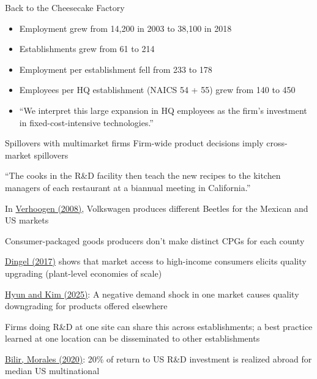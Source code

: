 \documentclass[11pt,notes=hide,aspectratio=169]{beamer}
\begin{document}
\begin{frame}{Back to the Cheesecake Factory}
\begin{itemize}
\item Employment grew from 14,200 in 2003 to 38,100 in 2018
\item Establishments grew from 61 to 214 
\item Employment per establishment fell from 233 to 178
\item Employees per HQ establishment (NAICS 54 + 55) grew from 140 to 450
\item ``We interpret this large expansion in HQ employees as the firm's investment in fixed-cost-intensive technologies.''
\end{itemize}
\end{frame}
\begin{frame}{Spillovers with multimarket firms}
Firm-wide product decisions imply cross-market spillovers
\begin{itemize}{\small
\item ``The cooks in the R\&D facility then teach the new recipes to the kitchen managers of each restaurant at a biannual meeting in California.''
\item In \href{https://doi.org/10.1162/qjec.2008.123.2.489}{Verhoogen (2008)}, Volkswagen produces different Beetles for the Mexican and US markets
\item Consumer-packaged goods producers don't make distinct CPGs for each county
\item \href{https://doi.org/10.1093/restud/rdw054}{Dingel (2017)} shows that market access to high-income consumers elicits quality upgrading (plant-level economies of scale) 
\item \href{https://sites.google.com/site/jungsikhyunecon/research}{Hyun and Kim (2025)}: A negative demand shock in one market  causes quality downgrading for products offered elsewhere
}\end{itemize}
Firms doing R\&D at one site can share this across establishments;
a best practice learned at one location can be disseminated to other establishments
\begin{itemize}{\small
\item \href{https://doi.org/10.1086/705418}{Bilir, Morales (2020)}:
20\% of return to US R\&D investment is realized abroad for median US multinational
}\end{itemize}
\end{frame}
\end{document}
